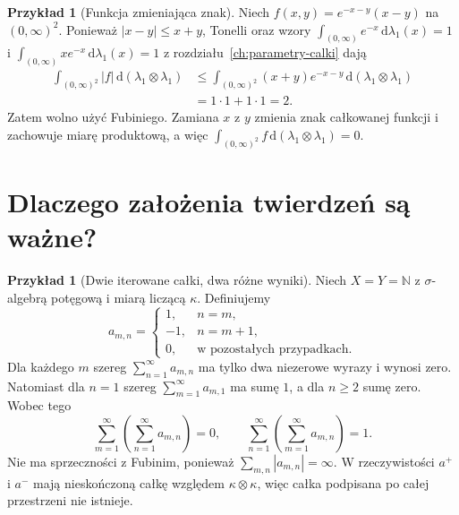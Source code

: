 \documentclass[11pt,a4paper,oneside]{book}
\numberwithin{equation}{chapter}
\theoremstyle{plain}
\theoremstyle{definition}
\newtheorem{przyklad}[twierdzenie]{Przykład}
\theoremstyle{remark}
\begin{document}
\begin{przyklad}[Funkcja zmieniająca znak]
Niech $f(x,y)=e^{-x-y}(x-y)$ na $(0,\infty)^2$.
Ponieważ $|x-y|\le x+y$, Tonelli oraz wzory
$\int_{(0,\infty)}e^{-x}\,\mathrm d\lambda_1(x)=1$ i
$\int_{(0,\infty)}xe^{-x}\,\mathrm d\lambda_1(x)=1$
z rozdziału~\ref{ch:parametry-calki} dają
\begin{align*}
\int_{(0,\infty)^2}|f|\,
\mathrm d(\lambda_1\otimes\lambda_1)
&\le\int_{(0,\infty)^2}(x+y)e^{-x-y}
\,\mathrm d(\lambda_1\otimes\lambda_1)\\
&=1\cdot1+1\cdot1=2.
\end{align*}
Zatem wolno użyć Fubiniego. Zamiana $x$ z $y$
zmienia znak całkowanej funkcji i zachowuje
miarę produktową, a więc
$\int_{(0,\infty)^2}f\,\mathrm d(\lambda_1\otimes\lambda_1)=0$.
\end{przyklad}

\section{Dlaczego założenia twierdzeń są ważne?}

\begin{przyklad}[Dwie iterowane całki, dwa różne wyniki]
\label{ex:nonabs-fubini-12}
Niech $X=Y=\mathbb N$ z $\sigma$-algebrą potęgową
i miarą liczącą $\kappa$. Definiujemy
\[
a_{m,n}=\begin{cases}
1,&n=m,\\
-1,&n=m+1,\\
0,&\text{w pozostałych przypadkach}.
\end{cases}
\]
Dla każdego $m$ szereg $\sum_{n=1}^\infty a_{m,n}$
ma tylko dwa niezerowe wyrazy i wynosi zero. Natomiast
dla $n=1$ szereg $\sum_{m=1}^\infty a_{m,1}$
ma sumę $1$, a dla $n\ge2$ sumę zero.
Wobec tego
\[
\sum_{m=1}^\infty\left(\sum_{n=1}^\infty a_{m,n}\right)=0,
\qquad
\sum_{n=1}^\infty\left(\sum_{m=1}^\infty a_{m,n}\right)=1.
\]
Nie ma sprzeczności z Fubinim, ponieważ
$\sum_{m,n}|a_{m,n}|=\infty$.
W rzeczywistości $a^+$ i $a^-$ mają nieskończoną
całkę względem $\kappa\otimes\kappa$, więc
całka podpisana po całej przestrzeni nie istnieje.
\end{przyklad}
\end{document}
